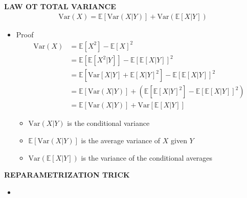 \begin{whitebox}{\textbf{LAW OT TOTAL VARIANCE}}
    \begin{align*}
        \mathrm{Var}(X)=\mathbb{E}[\mathrm{Var}(X|Y)]+\mathrm{Var}(\mathbb{E}[X|Y])
    \end{align*}
    \begin{itemize}
        \item Proof
        \begin{align*}
            \mathrm{Var}(X)&=\mathbb{E}[X^2]-\mathbb{E}[X]^2\\
            &=\mathbb{E}[\mathbb{E}[X^2|Y]]-\mathbb{E}[\mathbb{E}[X|Y]]^2\\
            &=\mathbb{E}[\mathrm{Var}[X|Y]+\mathbb{E}[X|Y]^2]-\mathbb{E}[\mathbb{E}[X|Y]]^2\\
            &=\mathbb{E}[\mathrm{Var}(X|Y)]+\left(\mathbb{E}[\mathbb{E}[X|Y]^2]-\mathbb{E}[\mathbb{E}[X|Y]]^2\right)\\
            &=\mathbb{E}[\mathrm{Var}(X|Y)]+\mathrm{Var}[\mathbb{E}[X|Y]]
        \end{align*}
        \begin{itemize}
            \item $\mathrm{Var}(X|Y)$ is the conditional variance
            \item $\mathbb{E}[\mathrm{Var}(X|Y)]$ is the average variance of $X$ given $Y$
            \item $\mathrm{Var}(\mathbb{E}[X|Y])$ is the variance of the conditional averages
        \end{itemize}
    \end{itemize}
\end{whitebox}

\begin{whitebox}{\textbf{REPARAMETRIZATION TRICK}}
    \begin{itemize}
        \item 
    \end{itemize}
\end{whitebox}